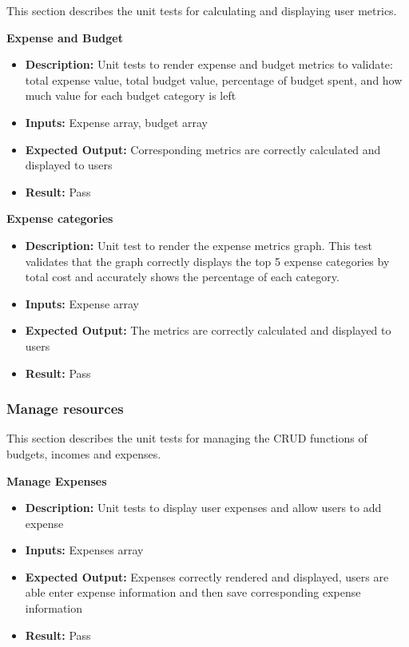 \documentclass[12pt, titlepage]{article}
\begin{document}
This section describes the unit tests for calculating and displaying user metrics.

\vspace{10pt}
\textbf{Expense and Budget}

\begin{itemize}
  \item \textbf{Description:} Unit tests to render expense and budget metrics to validate: total expense value, total budget value, percentage of budget spent, and
  how much value for each budget category is left
  \item \textbf{Inputs:} Expense array, budget array
  \item \textbf{Expected Output:} Corresponding metrics are correctly calculated and displayed to users
  \item \textbf{Result:} Pass
\end{itemize}

\textbf{Expense categories}

\begin{itemize}
  \item \textbf{Description:} Unit test to render the expense metrics graph. This test validates that the graph correctly displays the top 5 expense categories by 
  total cost and accurately shows the percentage of each category.
  \item \textbf{Inputs:} Expense array
  \item \textbf{Expected Output:} The metrics are correctly calculated and displayed to users
  \item \textbf{Result:} Pass
\end{itemize}

\subsubsection{Manage resources}

This section describes the unit tests for managing the CRUD functions of budgets, incomes and expenses.

\vspace{10pt}
\textbf{Manage Expenses}

\begin{itemize}
  \item \textbf{Description:} Unit tests to display user expenses and allow users to add expense
  \item \textbf{Inputs:} Expenses array
  \item \textbf{Expected Output:} Expenses correctly rendered and displayed, users are able enter expense information and then save corresponding expense information
  \item \textbf{Result:} Pass
\end{itemize}
\end{document}
